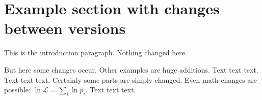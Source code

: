 \documentclass[a4paper,12pt]{article}
\begin{document}
\section{Example section with changes between versions}
This is the introduction paragraph. Nothing changed here.

But here some changes occur. Other examples are huge additions. Text text text.
Text text text. Certainly some parts are simply changed. Even math changes are possible: $\ln\mathcal{L} = \sum_i \ln p_i$. Text text text.
\end{document}
